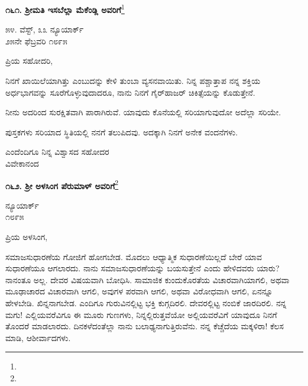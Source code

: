 \newpage

\begin{center}
\textbf{೧೬೧. ಶ‍್ರೀಮತಿ ಇಸಬೆಲ್ಲಾ ಮೆಕೆಂಡ್ಲಿ ಅವರಿಗೆ}\footnote{}
\end{center}

\begin{flushright}
೫೪. ವೆಸ್ಟ್, ೩೩ ನ್ಯೂಯಾರ್ಕ್\\೨೫ನೇ ಫೆಬ್ರವರಿ ೧೮೯೫
\end{flushright}

\vspace{-0.5cm}

\noindent
ಪ್ರಿಯ ಸಹೋದರಿ,

ನಿನಗೆ ಖಾಯಿಲೆಯಾಗಿತ್ತು ಎಂಬುದನ್ನು ಕೇಳಿ ತುಂಬಾ ವ್ಯಸನವಾಯಿತು. ನಿನ್ನ ಪಶ್ಚಾತ್ತಾಪ ನನ್ನ ಶಕ್ತಿಯ ಅರ್ಧಭಾಗವನ್ನು ಸೂರೆಗೊಳ್ಳುವುದಾದರೂ, ನಾನು ನಿನಗೆ ಗೈರ್‌ಹಾಜರ್ ಚಿಕಿತ್ಸೆಯನ್ನು  ಕೊಡುತ್ತೇನೆ.

ನೀನು ಅದರಿಂದ ಸುರಕ್ಷಿತವಾಗಿ ಪಾರಾಗಿರುವೆ. ಯಾವುದು ಕೊನೆಯಲ್ಲಿ ಸರಿಯಾಗುವುದೋ ಅದೆಲ್ಲಾ ಸರಿಯೇ.

ಪುಸ್ತಕಗಳು ಸರಿಯಾದ ಸ್ಥಿತಿಯಲ್ಲಿ ನನಗೆ ತಲುಪಿದವು. ಅದಕ್ಕಾಗಿ ನಿನಗೆ ಅನೇಕ ವಂದನೆಗಳು.

\vspace{-0.5cm}

{\flushright
ಎಂದೆಂದಿಗೂ ನಿನ್ನ ವಿಶ್ವಾಸದ ಸಹೋದರ\\ವಿವೇಕಾನಂದ\par}

\begin{center}
\textbf{೧೬೨. ಶ‍್ರೀ ಅಳಸಿಂಗ ಪೆರುಮಾಳ್ ಅವರಿಗೆ}\footnote{}
\end{center}

\vspace{-0.5cm}

\begin{flushright}
ನ್ಯೂಯಾರ್ಕ್\\೧೮೯೫
\end{flushright}

\vspace{-0.5cm}

\noindent
ಪ್ರಿಯ ಅಳಸಿಂಗ,

ಸಮಾಜಸುಧಾರಣೆಯ ಗೋಜಿಗೆ ಹೋಗಬೇಡ. ಮೊದಲು ಆಧ್ಯಾತ್ಮಿಕ ಸುಧಾರಣೆಯಿಲ್ಲದೆ ಬೇರೆ ಯಾವ ಸುಧಾರಣೆಯೂ ಆಗಲಾರದು. ನಾನು ಸಮಾಜಸುಧಾರಣೆಯನ್ನು ಬಯಸುತ್ತೇನೆ ಎಂದು ಹೇಳಿದವರು ಯಾರು? ನಾನಂತೂ ಅಲ್ಲ. ದೇವರ ವಿಷಯವಾಗಿ ಬೋಧಿಸಿ. ಸಾಮಾಜಿಕ ಕುಂದುಕೊರತೆಯ ವಿಚಾರವಾಗಿಯಾಗಲಿ, ಅಥವಾ ಮೂಢಾಚಾರದ ವಿಚಾರವಾಗಿ ಆಗಲಿ, ಅವುಗಳ ಪರವಾಗಿ ಆಗಲಿ, ಅಥವಾ ವಿರೋಧವಾಗಿ ಆಗಲಿ, ಏನನ್ನೂ ಹೇಳಬೇಡಿ. ಖಿನ್ನನಾಗಬೇಡ. ಎಂದಿಗೂ ಗುರುವಿನಲ್ಲಿಟ್ಟ ಭಕ್ತಿ ಕುಗ್ಗದಿರಲಿ. ದೇವರಲ್ಲಿಟ್ಟ ನಂಬಿಕೆ ಜಾರದಿರಲಿ. ನನ್ನ ಮಗು! ಎಲ್ಲಿಯವರೆವಿಗೂ ಈ ಮೂರು ಗುಣಗಳು, ನಿನ್ನಲ್ಲಿರುತ್ತವೆಯೋ ಅಲ್ಲಿಯವರೆವಿಗೆ ಯಾವುದೂ ನಿನಗೆ ತೊಂದರೆ ಮಾಡಲಾರದು. ದಿನಕಳೆದಂತೆಲ್ಲಾ ನಾನು ಬಲಾಢ್ಯನಾಗುತ್ತಿರುವೆನು. ನನ್ನ ಕೆಚ್ಚೆದೆಯ ಮಕ್ಕಳಿರಾ! ಕೆಲಸ ಮಾಡಿ, ಆಶೀರ್ವಾದಗಳು.

